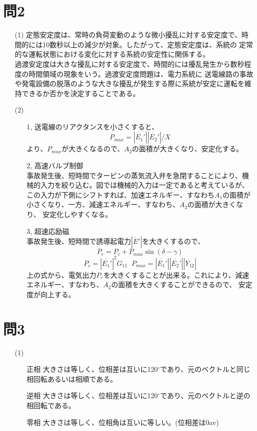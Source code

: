 \documentclass{jsarticle}
\begin{document}
\section{問2}
\begin{itemize}
 \item [(1)]
定態安定度は、常時の負荷変動のような微小擾乱に対する安定度で、時間的には10数秒以上の減少が対象。したがって、定態安定度は、系統の
定常的な運転状態における変化に対する系統の安定性に関係する。\\
過渡安定度は大きな擾乱に対する安定度で、時間的には擾乱発生から数秒程度の時間領域の現象をいう。過渡安定度問題は、電力系統に
送電線路の事故や発電設備の脱落のような大きな擾乱が発生する際に系統が安定に運転を維持できるか否かを決定することである。
 \item[(2)]
\begin{itemize}
 \item [1,]
送電線のリアクタンスを小さくすると、
       \begin{equation}
	P_{max}=|\dot{E_{1}'}||\dot{E_{2}'}|/X
       \end{equation}
       より、$P_{max}$が大きくなるので、$A_{2}$の面積が大きくなり、安定化する。
 \item [2,]高速バルブ制御\\
       事故発生後、短時間でタービンの蒸気流入弁を急閉することにより、機械的入力を絞り込む。図では機械的入力は一定であると考えているが、
       この入力が下側にシフトすれば、加速エネルギー、すなわち$A_{1}$の面積が小さくなり、一方、減速エネルギー、すなわち、$A_{2}$の面積が大きくなり、
       安定化しやすくなる。
 \item [3,]超速応励磁\\
       事故発生後、短時間で誘導起電力$|\dot{E'}|$を大きくするので、
       \begin{equation}
	P_{e}=P_{c}+P_{max}\sin(\delta - \gamma)
       \end{equation}
       \begin{equation}
	P_{c}=|\dot{E_{1}'}|^{2}G_{11} \;\; P_{max} = |\dot{E_{1}'}||\dot{E_{2}'}||\dot{Y_{12}}|
       \end{equation}
       上の式から、電気出力$P_{e}$を大きくすることが出来る。これにより、減速エネルギー、すなわち、$A_{2}$の面積を大きくすることができるので、
       安定度が向上する。
\end{itemize}
\end{itemize}
\section{問3}
\begin{itemize}
 \item [(1)]
       \begin{itemize}
	\item [正相]
	      大きさは等しく、位相差は互いに120$^\circ$であり、元のベクトルと同じ相回転あるいは相順である。
	\item [逆相]
	      大きさは等しく、位相差は互いに120$^\circ$であり、元のベクトルと逆の相回転である。
	\item [零相]
	      大きさは等しく、位相角は互いに等しい。(位相差は0av)
       \end{itemize}
\end{itemize}
\end{document}
